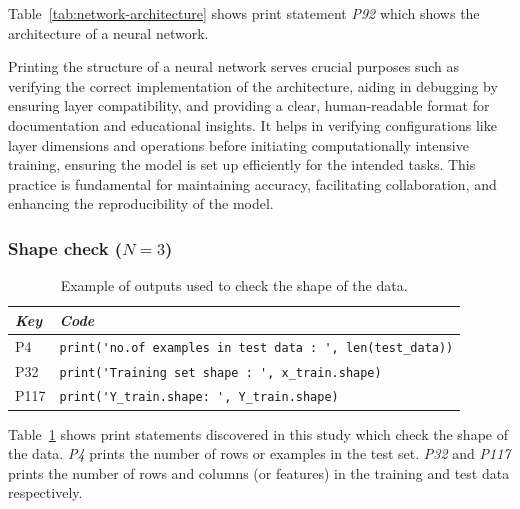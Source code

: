 Table~\ref{tab:network-architecture} shows print statement \emph{P92} which shows the architecture of a neural network.

Printing the structure of a neural network serves crucial purposes such as verifying the correct implementation of the architecture, aiding in debugging by ensuring layer compatibility, and providing a clear, human-readable format for documentation and educational insights. It helps in verifying configurations like layer dimensions and operations before initiating computationally intensive training, ensuring the model is set up efficiently for the intended tasks. This practice is fundamental for maintaining accuracy, facilitating collaboration, and enhancing the reproducibility of the model.


\subsubsection{Shape check ($N = 3$)}

\begin{table}
  \centering
  \caption{Example of outputs used to check the shape of the data.}
  \begin{tabular}{@{}m{} m{}@{}}
    \toprule
    \emph{\textbf{Key}} & \emph{\textbf{Code}}\\
    \midrule
    P4 &
    \lstinline[]$print('no.of examples in test data : ', len(test_data))$\\

    P32 &
    \lstinline[]$print('Training set shape : ', x_train.shape)$\\

    P117&
    \lstinline[]$print('Y_train.shape: ', Y_train.shape)$\\
    \bottomrule
  \end{tabular}
  \label{tab:shape-check}
\end{table}

Table~\ref{tab:shape-check} shows print statements discovered in this study which check the shape of the data. \emph{P4} prints the number of rows or examples in the test set. \emph{P32} and \emph{P117} prints the number of rows and columns (or features) in the training and test data respectively.

